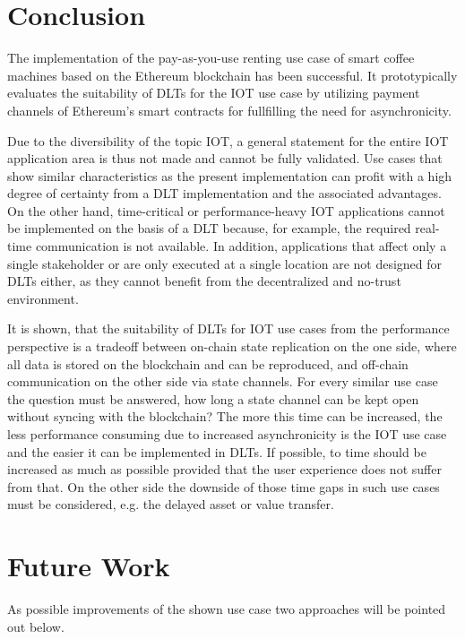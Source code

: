 \documentclass[conference]{IEEEtran}
\begin{document}
\section{Conclusion}
The implementation of the pay-as-you-use renting use case of smart coffee machines based on the Ethereum blockchain has been successful. It prototypically evaluates the suitability of DLTs for the IOT use case by utilizing payment channels of Ethereum's smart contracts for fullfilling the need for asynchronicity.

Due to the diversibility of the topic IOT, a general statement for the entire IOT application area is thus not made and cannot be fully validated. Use cases that show similar characteristics as the present implementation can profit with a high degree of certainty from a DLT implementation and the associated advantages. On the other hand, time-critical or performance-heavy IOT applications cannot be implemented on the basis of a DLT because, for example, the required real-time communication is not available. In addition, applications that affect only a single stakeholder or are only executed at a single location are not designed for DLTs either, as they cannot benefit from the decentralized and no-trust environment.

It is shown, that the suitability of DLTs for IOT use cases from the performance perspective is a tradeoff between on-chain state replication on the one side, where all data is stored on the blockchain and can be reproduced, and off-chain communication on the other side via state channels. For every similar use case the question must be answered, how long a state channel can be kept open without syncing with the blockchain? The more this time can be increased, the less performance consuming due to increased asynchronicity is the IOT use case and the easier it can be implemented in DLTs. If possible, to time should be increased as much as possible provided that the user experience does not suffer from that. On the other side the downside of those time gaps in such use cases must be considered, e.g. the delayed asset or value transfer. 

\section{Future Work}
As possible improvements of the shown use case two approaches will be pointed out below.
\end{document}
